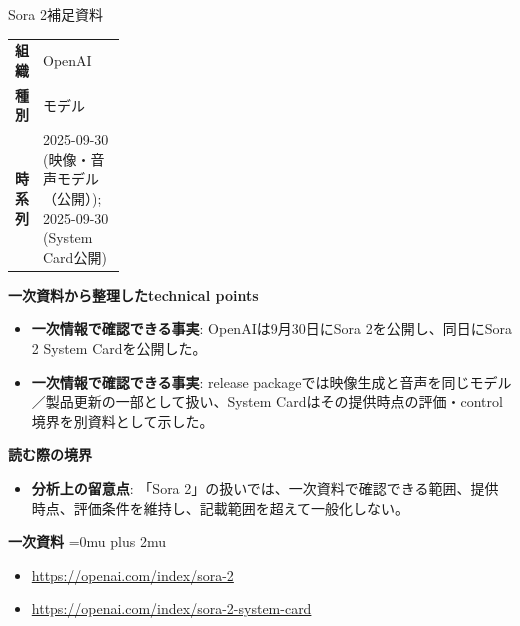 \begin{technicalnote}{Sora 2}{補足資料}
\begingroup
\begin{tabularx}{\linewidth}{@{}>{\bfseries}p{0.22\linewidth}X@{}}
組織 & OpenAI \\
種別 & モデル \\
時系列 & 2025-09-30 (映像・音声モデル（公開）); 2025-09-30 (System Card公開) \\
\end{tabularx}
\smallskip
{\bfseries 一次資料から整理したtechnical points}
\begin{itemize}[leftmargin=1.5em,itemsep=0.35em]
\item \textbf{一次情報で確認できる事実}: OpenAIは9月30日にSora 2を公開し、同日にSora 2 System Cardを公開した。
\item \textbf{一次情報で確認できる事実}: release packageでは映像生成と音声を同じモデル／製品更新の一部として扱い、System Cardはその提供時点の評価・control境界を別資料として示した。
\end{itemize}
\begin{minipage}{\linewidth}
{\bfseries 読む際の境界}
\begin{itemize}[leftmargin=1.5em,itemsep=0.35em]
\item \textbf{分析上の留意点}: 「Sora 2」の扱いでは、一次資料で確認できる範囲、提供時点、評価条件を維持し、記載範囲を超えて一般化しない。
\end{itemize}
\begin{samepage}
{\bfseries 一次資料}
\begingroup\sloppy
\Urlmuskip=0mu plus 2mu\relax
\begin{itemize}[leftmargin=1.5em,itemsep=0.25em]
\item {\scriptsize\url{https://openai.com/index/sora-2}}
\item {\scriptsize\url{https://openai.com/index/sora-2-system-card}}
\end{itemize}
\endgroup
\end{samepage}
\end{minipage}
\endgroup
\end{technicalnote}
\medskip

